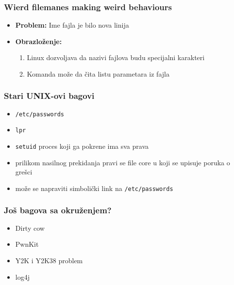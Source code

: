 \documentclass{beamer}
\begin{document}
\begin{frame}
    \frametitle{Wierd filemanes making weird behaviours}
    \begin{itemize}
        \item \textbf{Problem:} Ime fajla je bilo nova linija \newline
        \item \textbf{Obrazloženje: } \begin{enumerate}
            \item Linux dozvoljava da nazivi fajlova budu specijalni karakteri \newline
            \item Komanda može da čita listu parametara iz fajla
        \end{enumerate}
    \end{itemize}
\end{frame}

\begin{frame}
    \frametitle{Stari UNIX-ovi bagovi}
    \begin{itemize}
        \item \lstinline|/etc/passwords| \newline
        \item \lstinline|lpr| \newline
        \item \lstinline|setuid| proces koji ga pokrene ima sva prava \newline
        \item prilikom nasilnog prekidanja pravi se file core u koji se upisuje poruka o grešci \newline
        \item može se napraviti simbolički link na \lstinline|/etc/passwords|
    \end{itemize}
\end{frame}

\begin{frame}
    \frametitle{Još bagova sa okruženjem?}
    \begin{itemize}
        \item Dirty cow \newline
        \item PwnKit \newline
        \item Y2K i Y2K38 problem \newline
        \item log4j \newline
    \end{itemize}
\end{frame}
\end{document}
